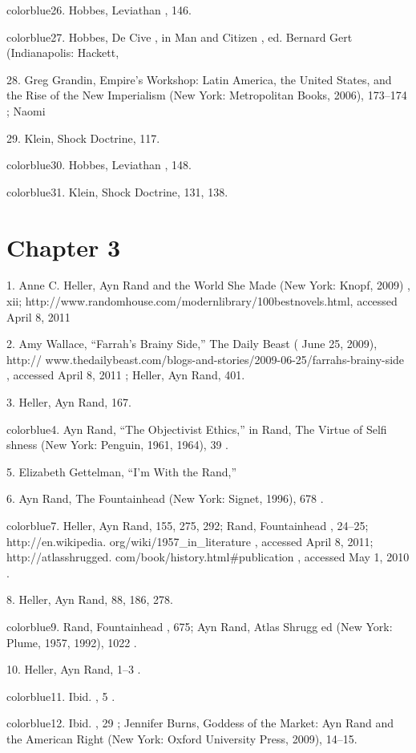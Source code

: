 	{color{blue}26}. Hobbes, Leviathan , 146.


	{color{blue}27}. Hobbes, De Cive , in Man and Citizen , ed. Bernard Gert (Indianapolis: Hackett,


	{\color{blue}28}. Greg Grandin, Empire’s Workshop: Latin America, the United States, and the Rise of the New Imperialism (New York: Metropolitan Books, 2006), 173–174 ; Naomi


	{\color{blue}29}. Klein, Shock Doctrine, 117.


	{color{blue}30}. Hobbes, Leviathan , 148.


	{color{blue}31}. Klein, Shock Doctrine, 131, 138.


\section{Chapter 3}


	{\color{blue}1}. Anne C. Heller, Ayn Rand and the World She Made (New York: Knopf, 2009) , xii; http://www.randomhouse.com/modernlibrary/100bestnovels.html, accessed April 8, 2011


	{\color{blue}2}. Amy Wallace, “Farrah’s Brainy Side,” The Daily Beast ( June 25, 2009), http:// www.thedailybeast.com/blogs-and-stories/2009-06-25/farrahs-brainy-side , accessed April 8, 2011 ; Heller, Ayn Rand, 401.


	{\color{blue}3}. Heller, Ayn Rand, 167.


	{color{blue}4}. Ayn Rand, “The Objectivist Ethics,” in Rand, The Virtue of Selfi shness (New York: Penguin, 1961, 1964), 39 .


	{\color{blue}5}. Elizabeth Gettelman, “I’m With the Rand,”


	{\color{blue}6}. Ayn Rand, The Fountainhead (New York: Signet, 1996), 678 .


	{color{blue}7}. Heller, Ayn Rand, 155, 275, 292; Rand, Fountainhead , 24–25; http://en.wikipedia. org/wiki/1957_in_literature , accessed April 8, 2011; http://atlasshrugged. com/book/history.html#publication , accessed May 1, 2010 .


	{\color{blue}8}. Heller, Ayn Rand, 88, 186, 278.


	{color{blue}9}. Rand, Fountainhead , 675; Ayn Rand, Atlas Shrugg ed (New York: Plume, 1957, 1992), 1022 .


	{\color{blue}10}. Heller, Ayn Rand, 1–3 .


	{color{blue}11}. Ibid. , 5 .


	{color{blue}12}. Ibid. , 29 ; Jennifer Burns, Goddess of the Market: Ayn Rand and the American Right (New York: Oxford University Press, 2009), 14–15.


